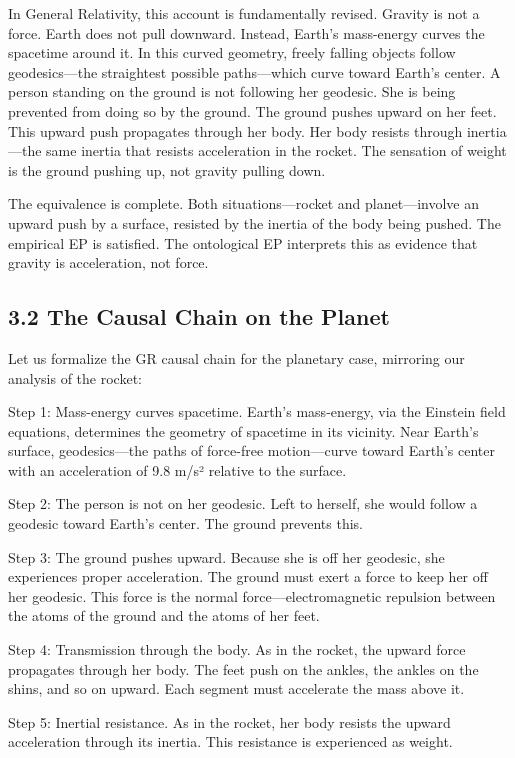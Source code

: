 \documentclass[11pt]{article}
\begin{document}
In General Relativity, this account is fundamentally revised. Gravity is not a force. Earth does not pull downward. Instead, Earth's mass-energy curves the spacetime around it. In this curved geometry, freely falling objects follow geodesics---the straightest possible paths---which curve toward Earth's center. A person standing on the ground is not following her geodesic. She is being prevented from doing so by the ground. The ground pushes upward on her feet. This upward push propagates through her body. Her body resists through inertia---the same inertia that resists acceleration in the rocket. The sensation of weight is the ground pushing up, not gravity pulling down.

The equivalence is complete. Both situations---rocket and planet---involve an upward push by a surface, resisted by the inertia of the body being pushed. The empirical EP is satisfied. The ontological EP interprets this as evidence that gravity is acceleration, not force.

\subsection{3.2 The Causal Chain on the Planet}

Let us formalize the GR causal chain for the planetary case, mirroring our analysis of the rocket:

Step 1: Mass-energy curves spacetime. Earth's mass-energy, via the Einstein field equations, determines the geometry of spacetime in its vicinity. Near Earth's surface, geodesics---the paths of force-free motion---curve toward Earth's center with an acceleration of 9.8 m/s² relative to the surface.

Step 2: The person is not on her geodesic. Left to herself, she would follow a geodesic toward Earth's center. The ground prevents this.

Step 3: The ground pushes upward. Because she is off her geodesic, she experiences proper acceleration. The ground must exert a force to keep her off her geodesic. This force is the normal force---electromagnetic repulsion between the atoms of the ground and the atoms of her feet.

Step 4: Transmission through the body. As in the rocket, the upward force propagates through her body. The feet push on the ankles, the ankles on the shins, and so on upward. Each segment must accelerate the mass above it.

Step 5: Inertial resistance. As in the rocket, her body resists the upward acceleration through its inertia. This resistance is experienced as weight.
\end{document}
